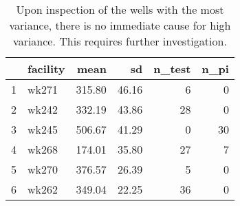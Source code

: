 \begin{table}[h]
\centering
\begin{tabular}{rlrrrr}
  \hline
 & facility & mean & sd & n\_test & n\_pi \\ 
  \hline
1 & wk271 & 315.80 & 46.16 &   6 &   0 \\ 
  2 & wk242 & 332.19 & 43.86 &  28 &   0 \\ 
  3 & wk245 & 506.67 & 41.29 &   0 &  30 \\ 
  4 & wk268 & 174.01 & 35.80 &  27 &   7 \\ 
  5 & wk270 & 376.57 & 26.39 &   5 &   0 \\ 
  6 & wk262 & 349.04 & 22.25 &  36 &   0 \\ 
   \hline
\end{tabular}
\caption{Upon inspection of the wells with the most variance, there is no immediate cause for high variance. This requires further investigation.} 
\label{tab:well_summaries}
\end{table}
